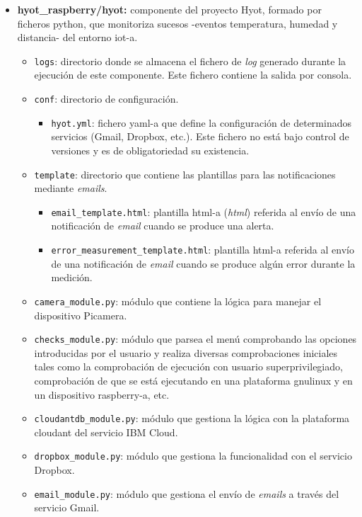\documentclass[12pt,a4paper, twoside]{report}
\begin{document}
\begin{itemize}
		\item \textbf{hyot\_raspberry/hyot:} componente del proyecto Hyot, formado por ficheros \gls{python}, que monitoriza sucesos -eventos temperatura, humedad y distancia- del entorno \gls{iot-a}.
		\begin{itemize}
			\item \texttt{logs}: directorio donde se almacena el fichero de \textit{log} generado durante la ejecución de este componente. Este fichero contiene la salida por consola.
			\item \texttt{conf}: directorio de configuración.
			\begin{itemize}
				\item \texttt{hyot.yml}: fichero \gls{yaml-a} que define la configuración de determinados servicios (Gmail, Dropbox, etc.). Este fichero no está bajo control de versiones y es de obligatoriedad su existencia.
			\end{itemize}
			\item \texttt{template}: directorio que contiene las plantillas para las notificaciones mediante \textit{emails}.
			\begin{itemize}
				\item \texttt{email\_template.html}: plantilla \gls{html-a} (\textit{\gls{html}}) referida al envío de una notificación de \textit{email} cuando se produce una alerta.
				\item \texttt{error\_measurement\_template.html}: plantilla \gls{html-a} referida al envío de una notificación de \textit{email} cuando se produce algún error durante la medición.
			\end{itemize}
			\item \texttt{camera\_module.py}: módulo que contiene la lógica para manejar el dispositivo Picamera.
			\item \texttt{checks\_module.py}: módulo que parsea el menú comprobando las opciones introducidas por el usuario y realiza diversas comprobaciones iniciales tales como la comprobación de ejecución con usuario superprivilegiado, comprobación de que se está ejecutando en una plataforma \gls{gnulinux} y en un dispositivo \gls{raspberry-a}, etc.
			\item \texttt{cloudantdb\_module.py}: módulo que gestiona la lógica con la plataforma \gls{cloudant} del servicio IBM Cloud.
			\item \texttt{dropbox\_module.py}: módulo que gestiona la funcionalidad con el servicio Dropbox.
			\item \texttt{email\_module.py}: módulo que gestiona el envío de \textit{emails} a través del servicio Gmail.

\end{itemize}
\end{itemize}
\end{document}
